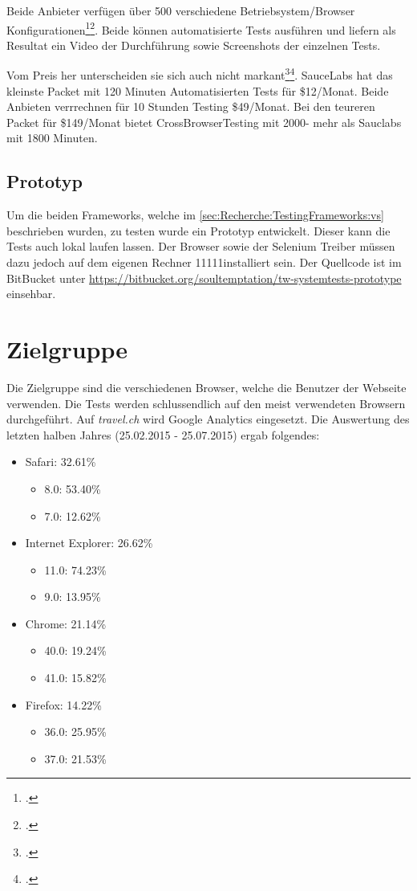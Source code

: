 Beide Anbieter verfügen über 500 verschiedene Betriebsystem/Browser Konfigurationen\footcite{Platforms_2015-07-26}\footcite{OS_Browser_Configurations_for_Cross_Browser_Compatibility_Testing_2015-07-26}. Beide können automatisierte Tests ausführen und liefern als Resultat ein Video der Durchführung sowie Screenshots der einzelnen Tests.

Vom Preis her unterscheiden sie sich auch nicht markant\footcite{Sauce_Labs_Pricing_2015-07-26}\footcite{Test_your_site_on_all_browsers_2015-07-26}. SauceLabs hat das kleinste Packet mit 120 Minuten Automatisierten Tests für \$12/Monat. Beide Anbieten verrrechnen für 10 Stunden Testing \$49/Monat. Bei den teureren Packet für \$149/Monat bietet CrossBrowserTesting mit 2000- mehr als Sauclabs mit 1800 Minuten.

\subsection{Prototyp}
Um die beiden Frameworks, welche im \cref{sec:Recherche:TestingFrameworks:vs}  beschrieben wurden, zu testen wurde ein Prototyp entwickelt. Dieser kann die Tests auch lokal laufen lassen. Der Browser sowie der Selenium Treiber müssen dazu jedoch auf dem eigenen Rechner 	11111installiert sein. Der Quellcode ist im BitBucket unter \url{https://bitbucket.org/soultemptation/tw-systemtests-prototype} einsehbar.

\section{Zielgruppe}
Die Zielgruppe sind die verschiedenen Browser, welche die Benutzer der Webseite verwenden. Die Tests werden schlussendlich auf den meist verwendeten Browsern durchgeführt.
Auf \textit{travel.ch} wird Google Analytics eingesetzt. Die Auswertung des letzten halben Jahres (25.02.2015 - 25.07.2015) ergab folgendes:
\begin{itemize}
\item Safari: 32.61\%
	\begin{itemize}
			\item 8.0: 53.40\%
			\item 7.0: 12.62\%
	\end{itemize}
\item Internet Explorer: 26.62\%
	\begin{itemize}
			\item 11.0: 74.23\%
			\item 9.0: 13.95\%
	\end{itemize}
\item Chrome: 21.14\%
	\begin{itemize}
			\item 40.0: 19.24\%
			\item 41.0: 15.82\%
	\end{itemize}
\item Firefox: 14.22\%
	\begin{itemize}
			\item 36.0: 25.95\%
			\item 37.0: 21.53\%
	\end{itemize}
\end{itemize}